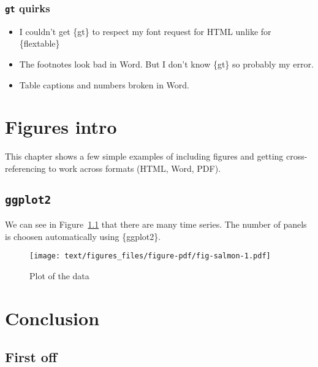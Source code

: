 \documentclass[
  letterpaper,
  oneside]{scrbook}
\providecommand{\tightlist}{%
  \setlength{\itemsep}{0pt}\setlength{\parskip}{0pt}}\usepackage{longtable,booktabs,array}
\begin{document}
\hypertarget{gt-quirks}{%
\subsection{\texorpdfstring{\texttt{gt}
quirks}{gt quirks}}\label{gt-quirks}}

\begin{itemize}
\tightlist
\item
  I couldn't get \{gt\} to respect my font request for HTML unlike for
  \{flextable\}
\item
  The footnotes look bad in Word. But I don't know \{gt\} so probably my
  error.
\item
  Table captions and numbers broken in Word.
\end{itemize}


\hypertarget{figures-intro}{%
\chapter{Figures intro}\label{figures-intro}}

This chapter shows a few simple examples of including figures and
getting cross-referencing to work across formats (HTML, Word, PDF).

\hypertarget{ggplot2}{%
\section{\texorpdfstring{\texttt{ggplot2}}{ggplot2}}\label{ggplot2}}

We can see in Figure~\ref{fig-salmon} that there are many time series.
The number of panels is choosen automatically using \{ggplot2\}.

\begin{figure}

{\centering \texttt{[image: text/figures\_files/figure-pdf/fig-salmon-1.pdf]}

}

\caption{\label{fig-salmon}Plot of the data}

\end{figure}


\hypertarget{conclusion}{%
\chapter{Conclusion}\label{conclusion}}

\hypertarget{first-off}{%
\section{First off}\label{first-off}}
\end{document}
